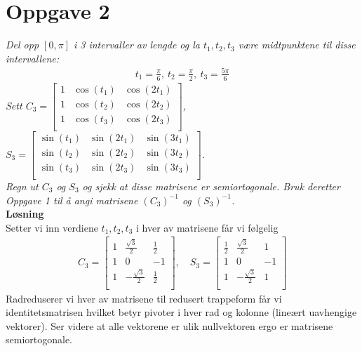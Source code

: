 \documentclass[12pt,
               a4paper,
               article,
               oneside,
               oldfontcommands,
               norsk]{memoir}
\begin{document}
\section*{Oppgave 2}
\emph{Del opp $[0, \pi]$ i 3 intervaller av lengde og la $t_1, t_2, t_3$ være midtpunktene til disse intervallene:}
\begin{align*}
t_1 = \frac{\pi}{6}, \ t_2 = \frac{\pi}{2}, \ t_3 = \frac{5\pi}{6}
\end{align*}
\emph{Sett $ C_3 = \begin{bmatrix}
1 &\cos(t_1) & \cos(2t_1) \\[3pt]
1 &\cos(t_2) & \cos(2t_2) \\[3pt]
1 &\cos(t_3) & \cos(2t_3) \\[3pt]
\end{bmatrix}$, \ $S_3 = \begin{bmatrix}
\sin(t_1) &\sin(2t_1) & \sin(3t_1) \\[3pt]
\sin(t_2)&\sin(2t_2) & \sin(3t_2) \\[3pt]
\sin(t_3)&\sin(2t_3) & \sin(3t_3) \\[3pt]
\end{bmatrix}$.\vspace{2mm}\\ Regn ut $C_3$ og $S_3$ og sjekk at disse matrisene er semiortogonale. Bruk deretter Oppgave 1 til å angi
matrisene $(C_3)^{-1}$ og $(S_3)^{-1}$.}\vspace{3mm}\\
\textbf{Løsning}\vspace{3mm}\\
Setter vi inn verdiene $t_1, t_2, t_3$ i hver av matrisene får vi følgelig
\begin{align*}
C_3 = \begin{bmatrix}
1 & \frac{\sqrt{3}}{2} & \frac{1}{2} \\[4pt]
1 & 0 & -1 \\[4pt]
1 & -\frac{\sqrt{3}}{2} & \frac{1}{2}\\[4pt]
\end{bmatrix}, \quad
S_3 = \begin{bmatrix}
\frac{1}{2}& \frac{\sqrt{3}}{2} & 1 \\[4pt]
1 & 0 & -1 \\[4pt]
1 & -\frac{\sqrt{3}}{2} & 1 \\[4pt]
\end{bmatrix}
\end{align*}
Radreduserer vi hver av matrisene til redusert trappeform får vi identitetsmatrisen hvilket betyr pivoter i hver rad og kolonne (lineært uavhengige vektorer). Ser videre at alle vektorene er ulik nullvektoren ergo er matrisene semiortogonale.\vspace{3mm}\\
\end{document}
